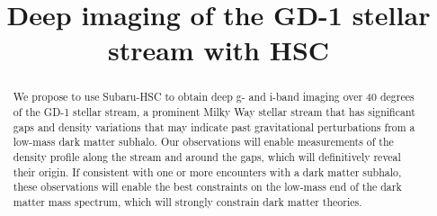 \documentclass{article}
\begin{document}
\semester{}
\proposalid{}
\receivedate{}


\title{Deep imaging of the GD-1 stellar stream with HSC}

\PIphone     {}

\MilkyWay

\begin{abstract}
We propose to use Subaru-HSC to obtain deep g- and i-band imaging over 40 degrees of the GD-1 stellar stream, a prominent Milky Way stellar stream that has significant gaps and density variations that may indicate past gravitational perturbations from a low-mass dark matter subhalo. Our observations will enable measurements of the density profile along the stream and around the gaps, which will definitively reveal their origin. If consistent with one or more encounters with a dark matter subhalo, these observations will enable the best constraints on the low-mass end of the dark matter mass spectrum, which will strongly constrain dark matter theories.
\end{abstract}

\begin{investigators}
\CoI{}{}{}{}
\CoI{}{}{}{}
\CoI{}{}{}{}
\CoI{}{}{}{}
\CoI{}{}{}{}
\CoI{}{}{}{}
\coiflag{}

\thesis{}{}


\end{investigators}
\end{document}
